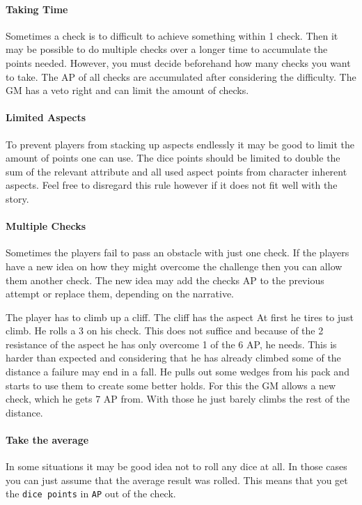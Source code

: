 \documentclass[11pt]{article}
\begin{document}
{\paragraph*{Taking Time}
\label{sec:org79e7ae5}
Sometimes a check is to difficult to achieve something within 1 check. Then it may be possible to do multiple checks over a longer time to accumulate the points needed. However, you must decide beforehand how many checks you want to take. The AP of all checks are accumulated after considering the difficulty. The GM has a veto right and can limit the amount of checks.
\paragraph*{Limited Aspects}
\label{sec:orge089abc}
To prevent players from stacking up aspects endlessly it may be good to limit the amount of points one can use. The dice points should be limited to double the sum of the relevant attribute and all used aspect points from character inherent aspects. Feel free to disregard this rule however if it does not fit well with the story.
\paragraph*{Multiple Checks}
\label{sec:org25ce7b7}
Sometimes the players fail to pass an obstacle with just one check. If the players have a new idea on how they might overcome the challenge then you can allow them another check. The new idea may add the checks AP to the previous attempt or replace them, depending on the narrative.

\begin{pwexample}
The player has to climb up a cliff. The cliff has the aspect  At first he tires to just climb. He rolls a 3 on his check. This does not suffice and because of the 2 resistance of the aspect he has only overcome 1 of the 6 AP, he needs. This is harder than expected and considering that he has already climbed some of the distance a failure may end in a fall. He pulls out some wedges from his pack and starts to use them to create some better holds. For this the GM allows a new check, which he gets 7 AP from. With those he just barely climbs the rest of the distance.
\end{pwexample}
\paragraph*{Take the average}
\label{sec:org337ee9f}
In some situations it may be good idea not to roll any dice at all. In those cases you can just assume that the average result was rolled. This means that you get the \texttt{dice points} in \texttt{AP} out of the check. 
}
\end{document}
